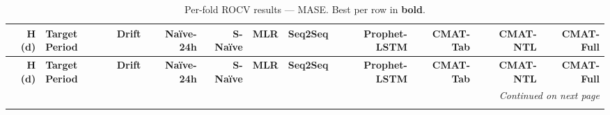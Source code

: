 \begingroup\small\setlength{\tabcolsep}{2pt}\renewcommand{\arraystretch}{1.2}
\begin{longtable}{r l r r r r r r r r r}
\caption{Per-fold ROCV results --- MASE. Best per row in \textbf{bold}.}
\label{tab:baseline_mase} \\

\toprule
\textbf{H (d)} & \textbf{Target Period} & \textbf{Drift} & \textbf{Na\"ive-24h} & \textbf{S-Na\"ive} & \textbf{MLR} & \textbf{Seq2Seq} & \textbf{Prophet-LSTM} & \textbf{CMAT-Tab} & \textbf{CMAT-NTL} & \textbf{CMAT-Full} \\
\midrule
\endfirsthead

\toprule
\textbf{H (d)} & \textbf{Target Period} & \textbf{Drift} & \textbf{Na\"ive-24h} & \textbf{S-Na\"ive} & \textbf{MLR} & \textbf{Seq2Seq} & \textbf{Prophet-LSTM} & \textbf{CMAT-Tab} & \textbf{CMAT-NTL} & \textbf{CMAT-Full} \\
\midrule
\endhead

\midrule
\multicolumn{11}{r}{\textit{Continued on next page}} \\
\endfoot

\bottomrule
\endlastfoot


\end{longtable}
